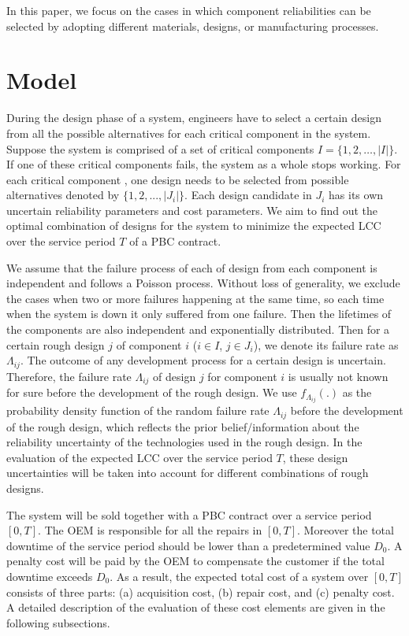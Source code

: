 \documentclass[preprint,12pt]{elsarticle}
\begin{document}
In this paper, we focus on the cases in which component reliabilities can be selected by adopting different materials, designs, or manufacturing processes.

\section{Model}
During the design phase of a system, engineers have to select a certain design from all the possible alternatives for each critical component in the system. Suppose the system is comprised of a set of critical components $I=\{1,2,\dots,\lvert I \rvert\}$. If one of these critical components fails, the system as a whole stops working. For each critical component , one design needs to be selected from possible alternatives denoted by $\{1,2,...,\lvert J_{i} \rvert\}$. Each design candidate in $J_{i}$ has its own uncertain reliability parameters and cost parameters. We aim to find out the optimal combination of designs for the system to minimize the expected LCC over the service period $T$ of a PBC contract.

We assume that the failure process of each of design from each component is independent and follows a Poisson process. Without loss of generality, we exclude the cases when two or more failures happening at the same time, so each time when the system is down it only suffered from one failure. Then the lifetimes of the components are also independent and exponentially distributed. Then for a certain rough design $j$ of component $i$ ($i \in I$, $j \in J_{i}$), we denote its failure rate as $\Lambda_{ij}$. The outcome of any development process for a certain design is uncertain. Therefore, the failure rate $\Lambda_{ij}$ of design $j$ for component $i$ is usually not known for sure before the development of the rough design. We use $f_{\Lambda_{ij}}(.)$ as the probability density function of the random failure rate $\Lambda_{ij}$ before the development of the rough design, which reflects the prior belief/information about the reliability uncertainty of the technologies used in the rough design. In the evaluation of the expected LCC over the service period $T$, these design uncertainties will be taken into account for different combinations of rough designs.

The system will be sold together with a PBC contract over a service period $[0,T]$. The OEM is responsible for all the repairs in $[0,T]$. Moreover the total downtime of the service period should be lower than a predetermined value $D_0$. A penalty cost will be paid by the OEM to compensate the customer if the total downtime exceeds $D_{0}$. As a result, the expected total cost of a system over $[0, T]$ consists of three parts: (a) acquisition cost, (b) repair cost, and (c) penalty cost. A detailed description of the evaluation of these cost elements are given in the following subsections.
\end{document}

